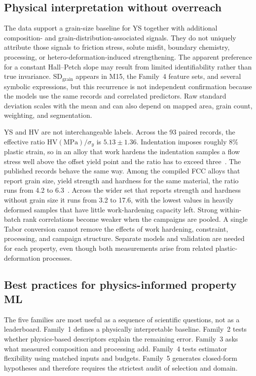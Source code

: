 \documentclass[5p,times,twocolumn]{elsarticle}
\begin{document}
\subsection{Physical interpretation without overreach}

The data support a grain-size baseline for YS together with additional composition- and grain-distribution-associated signals. They do not uniquely attribute those signals to friction stress, solute misfit, boundary chemistry, processing, or hetero-deformation-induced strengthening. The apparent preference for a constant Hall--Petch slope may result from limited identifiability rather than true invariance. $\mathrm{SD}_{\mathrm{grain}}$ appears in M15, the Family~4 feature sets, and several symbolic expressions, but this recurrence is not independent confirmation because the models use the same records and correlated predictors. Raw standard deviation scales with the mean and can also depend on mapped area, grain count, weighting, and segmentation.

YS and HV are not interchangeable labels. Across the 93 paired records, the effective ratio $\mathrm{HV(MPa)}/\sigma_y$ is $5.13\pm1.36$. Indentation imposes roughly 8\% plastic strain, so in an alloy that work hardens the indentation samples a flow stress well above the offset yield point and the ratio has to exceed three~\cite{Tabor1951,Figueiredo2023}. The published records behave the same way. Among the compiled FCC alloys that report grain size, yield strength and hardness for the same material, the ratio runs from 4.2 to 6.3~\cite{Borg2020}. Across the wider set that reports strength and hardness without grain size it runs from 3.2 to 17.6, with the lowest values in heavily deformed samples that have little work-hardening capacity left. Strong within-batch rank correlations become weaker when the campaigns are pooled. A single Tabor conversion cannot remove the effects of work hardening, constraint, processing, and campaign structure. Separate models and validation are needed for each property, even though both measurements arise from related plastic-deformation processes.

\subsection{Best practices for physics-informed property ML}

The five families are most useful as a sequence of scientific questions, not as a leaderboard. Family~1 defines a physically interpretable baseline. Family~2 tests whether physics-based descriptors explain the remaining error. Family~3 asks what measured composition and processing add. Family~4 tests estimator flexibility using matched inputs and budgets. Family~5 generates closed-form hypotheses and therefore requires the strictest audit of selection and domain.
\end{document}
